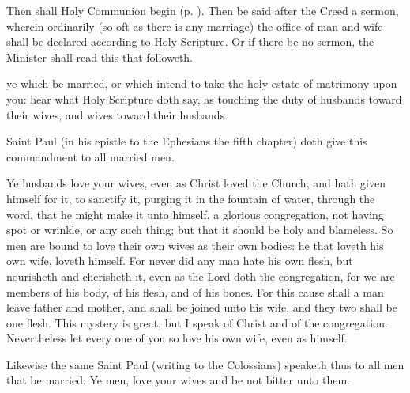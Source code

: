 

\begin{rubric}
	Then shall Holy Communion begin (p. \pageref{MatrimonyMass}). Then be said after the Creed a sermon, wherein ordinarily (so oft as there is any marriage) the office of man and wife shall be declared according to Holy Scripture. Or if there be no sermon, the Minister shall read this that followeth.
\end{rubric}
 ye which be married, or which intend to take the holy estate of matrimony upon you: hear what Holy Scripture doth say, as touching the duty of husbands toward their wives, and wives toward their husbands.\par
    Saint Paul (in his epistle to the Ephesians the fifth chapter) doth give this commandment to all married men.\par
    Ye husbands love your wives, even as Christ loved the Church, and hath given himself for it, to sanctify it, purging it in the fountain of water, through the word, that he might make it unto himself, a glorious congregation, not having spot or wrinkle, or any such thing; but that it should be holy and blameless. So men are bound to love their own wives as their own bodies: he that loveth his own wife, loveth himself. For never did any man hate his own flesh, but nourisheth and cherisheth it, even as the Lord doth the congregation, for we are members of his body, of his flesh, and of his bones. For this cause shall a man leave father and mother, and shall be joined unto his wife, and they two shall be one flesh. This mystery is great, but I speak of Christ and of the congregation. Nevertheless let every one of you so love his own wife, even as himself.\par
    Likewise the same Saint Paul (writing to the Colossians) speaketh thus to all men that be married: Ye men, love your wives and be not bitter unto them.\par
